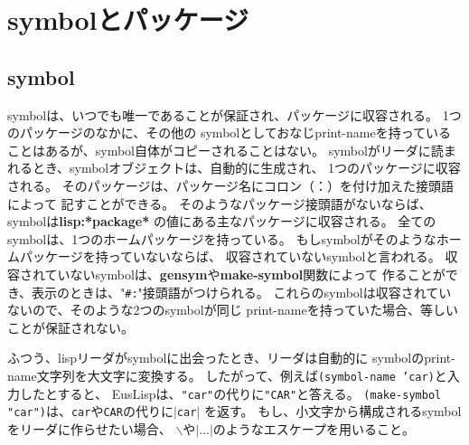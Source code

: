 \section{symbolとパッケージ}

\subsection{symbol}
symbolは、いつでも唯一であることが保証され、パッケージに収容される。
1つのパッケージのなかに、その他の
symbolとしておなじprint-nameを持っていることはあるが、symbol自体がコピーされることはない。
symbolがリーダに読まれるとき、symbolオブジェクトは、自動的に生成され、
1つのパッケージに収容される。
そのパッケージは、パッケージ名にコロン（：）を付け加えた接頭語によって
記すことができる。
そのようなパッケージ接頭語がないならば、symbolは{\bf lisp:*package*}
の値にある主なパッケージに収容される。
全てのsymbolは、1つのホームパッケージを持っている。
もしsymbolがそのようなホームパッケージを持っていないならば、
収容されていないsymbolと言われる。
収容されていないsymbolは、{\bf gensym}や{\bf make-symbol}関数によって
作ることができ、表示のときは、"{\tt \#:}"接頭語がつけられる。
これらのsymbolは収容されていないので、そのような2つのsymbolが同じ
print-nameを持っていた場合、等しいことが保証されない。

ふつう、lispリーダがsymbolに出会ったとき、リーダは自動的に
symbolのprint-name文字列を大文字に変換する。
したがって、例えば{\tt (symbol-name 'car)}と入力したとすると、
EusLispは、{\tt "car"}の代りに{\tt "CAR"}と答える。
{\tt (make-symbol "car")}は、{\tt car}や{\tt CAR}の代りに$|${\tt car}$|$
を返す。
もし、小文字から構成されるsymbolをリーダに作らせたい場合、
$\backslash$や$|...|$のようなエスケープを用いること。

